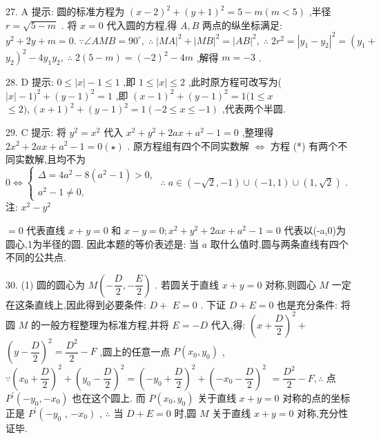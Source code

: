 27. A 提示: 圆的标准方程为 ${\left( x - 2\right) }^{2} + {\left( y + 1\right) }^{2} = 5 - m\left( {m < 5}\right)$ ,半径 $r = \sqrt{5 - m}$ . 将 $x = 0$ 代入圆的方程,得 $A,B$ 两点的纵坐标满足: ${y}^{2} + {2y} + m = 0.\;\because \angle {AMB} = {90}^{ \circ  },\;\therefore \;{\left| MA\right| }^{2} + {\left| MB\right| }^{2} = {\left| AB\right| }^{2},\;\therefore \;2{r}^{2} = {\left| {y}_{1} - {y}_{2}\right| }^{2} = \left( {y}_{1}\right.  +$  ${\left. {y}_{2}\right) }^{2} - 4{y}_{1}{y}_{2},\;\therefore \;2\left( {5 - m}\right)  = {\left( -2\right) }^{2} - {4m}$ ,解得 $m =  - 3$ .

28. D 提示: $0 \leq  \left| x\right|  - 1 \leq  1$ ,即 $1 \leq  \left| x\right|  \leq  2$ ,此时原方程可改写为( $\left| x\right|  - 1{)}^{2} + {\left( y - 1\right) }^{2} = 1$ ,即 ${\left( x - 1\right) }^{2} + {\left( y - 1\right) }^{2} = 1(1 \leq  x$  $\leq  2),{\left( x + 1\right) }^{2} + {\left( y - 1\right) }^{2} = 1\left( {-2 \leq  x \leq   - 1}\right)$ ,代表两个半圆.

29. C 提示: 将 ${y}^{2} = {x}^{2}$ 代入 ${x}^{2} + {y}^{2} + {2ax} + {a}^{2} - 1 = 0$ ,整理得 $2{x}^{2} + {2ax} + {a}^{2} - 1 = 0\left( \star \right)$ . 原方程组有四个不同实数解 $\Leftrightarrow$ 方程 (*) 有两个不同实数解,且均不为 $0 \Leftrightarrow  \left\{  {\begin{array}{l} \Delta  = 4{a}^{2} - 8\left( {{a}^{2} - 1}\right)  > 0, \\  {a}^{2} - 1 \neq  0, \end{array}\;\therefore \;a \in  \left( {-\sqrt{2}, - 1}\right)  \cup  \left( {-1,1}\right)  \cup  \left( {1,\sqrt{2}}\right) }\right.$ . 注: ${x}^{2} - {y}^{2}$

$= 0$ 代表直线 $x + y = 0$ 和 $x - y = 0;{x}^{2} + {y}^{2} + {2ax} + {a}^{2} - 1 = 0$ 代表以(-a,0)为圆心,1为半径的圆. 因此本题的等价表述是: 当 $a$ 取什么值时,圆与两条直线有四个不同的公共点.

30. (1) 圆的圆心为 $M\left( {-\dfrac{D}{2}, - \dfrac{E}{2}}\right)$ . 若圆关于直线 $x + y = 0$ 对称,则圆心 $M$ 一定在这条直线上,因此得到必要条件: $D +$  $E = 0$ . 下证 $D + E = 0$ 也是充分条件: 将圆 $M$ 的一般方程整理为标准方程,并将 $E =  - D$ 代入,得: ${\left( x + \dfrac{D}{2}\right) }^{2} +$  ${\left( y - \dfrac{D}{2}\right) }^{2} = \dfrac{{D}^{2}}{2} - F$ ,圆上的任意一点 $P\left( {{x}_{0},{y}_{0}}\right)$ , $\because {\left( {x}_{0} + \dfrac{D}{2}\right) }^{2} + {\left( {y}_{0} - \dfrac{D}{2}\right) }^{2} = {\left( -{y}_{0} + \dfrac{D}{2}\right) }^{2} + {\left( -{x}_{0} - \dfrac{D}{2}\right) }^{2}$  $= \dfrac{{D}^{2}}{2} - F,\therefore$ 点 ${P}^{\prime }\left( {-{y}_{0}, - {x}_{0}}\right)$ 也在这个圆上. 而 $P\left( {{x}_{0},{y}_{0}}\right)$ 关于直线 $x + y = 0$ 对称的点的坐标正是 ${P}^{\prime }\left( {-{y}_{0}}\right.$ , $\left. {-{x}_{0}}\right)$ , $\therefore$ 当 $D + E = 0$ 时,圆 $M$ 关于直线 $x + y = 0$ 对称,充分性证毕.

